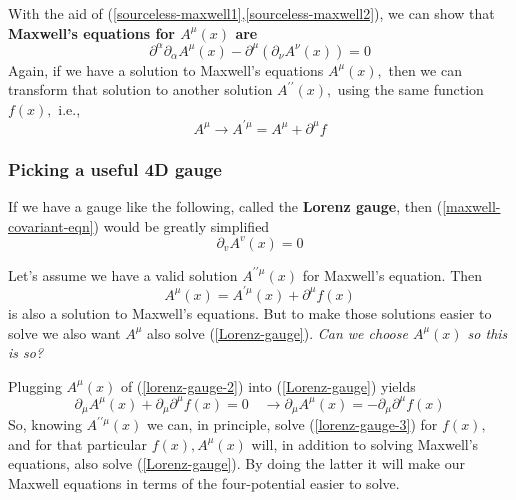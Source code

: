With the aid of (\ref{sourceless-maxwell1},\ref{sourceless-maxwell2}), we can show that \textbf{Maxwell's equations for $A^{\mu}(x)$ are}
\begin{equation}
\partial^{\alpha} \partial_{\alpha} A^{\mu}(x)-\partial^{\mu}\left(\partial_{\nu} A^{\nu}(x)\right)=0
\label{maxwell-covariant-eqn}
\end{equation}
Again, if we have a solution to Maxwell's equations $A^{\mu}(x),$ then we can transform that solution to another solution $A^{\prime \prime}(x),$ using the same function $f(x),$ i.e.,
$$
A^{\mu} \rightarrow A^{\prime \mu}=A^{\mu}+\partial^{\mu} f
$$
\subsubsection{Picking a useful 4D gauge}
\begin{qt}
    If we have a gauge like the following, called the \textbf{Lorenz gauge}, then (\ref{maxwell-covariant-eqn}) would be greatly simplified
    \begin{equation}
\partial_{v} A^{v}(x)=0
\label{Lorenz-gauge}
\end{equation}
\end{qt}
Let's assume we have a valid solution $A^{\prime\prime\mu}(x)$ for Maxwell's equation. Then
\begin{equation}
A^{\mu}(x)=A^{\prime \mu}(x)+\partial^{\mu} f(x)
\label{lorenz-gauge-2}
\end{equation}
is also a solution to Maxwell's equations. But to make those solutions easier to solve we also want $A^{\mu}$ also solve (\ref{Lorenz-gauge}). \textit{Can we choose $A^{\mu}(x)$ so this is so?}

Plugging $A^{\mu}(x)$ of (\ref{lorenz-gauge-2}) into (\ref{Lorenz-gauge}) yields
\begin{equation}
\partial_{\mu} A^{\mu}(x)+\partial_{\mu} \partial^{\mu} f(x)=0 \quad \rightarrow \partial_{\mu} A^{\mu}(x)=-\partial_{\mu} \partial^{\mu} f(x)
\label{lorenz-gauge-3}
\end{equation}
So, knowing $A^{\prime \prime \mu}(x)$ we can, in principle, solve (\ref{lorenz-gauge-3}) for $f(x),$ and for that particular $f(x), A^{\mu}(x)$ will, in addition to solving Maxwell's equations, also solve (\ref{Lorenz-gauge}). By doing the latter it will make our Maxwell equations in terms of the four-potential easier to solve.



